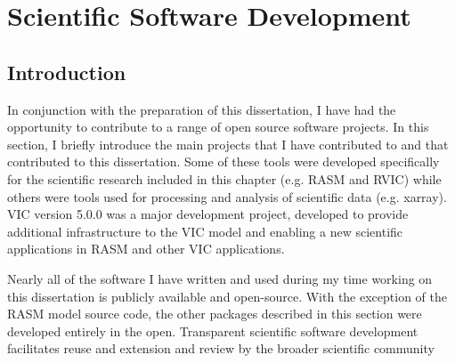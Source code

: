 \appendix
\raggedbottom\sloppy

\chapter{Scientific Software Development}
\label{chap:software}

\section{Introduction}
In conjunction with the preparation of this dissertation, I have had the opportunity to contribute to a range of open source software projects.
In this section, I briefly introduce the main projects that I have contributed to and that contributed to this dissertation.
Some of these tools were developed specifically for the scientific research included in this chapter (e.g. RASM and RVIC) while others were tools used for processing and analysis of scientific data (e.g. xarray).
VIC version 5.0.0 was a major development project, developed to provide additional infrastructure to the VIC model and enabling a new scientific applications in RASM and other VIC applications.

Nearly all of the software I have written and used during my time working on this dissertation is publicly available and open-source.
With the exception of the RASM model source code, the other packages described in this section were developed entirely in the open.
Transparent scientific software development facilitates reuse and extension and review by the broader scientific community

